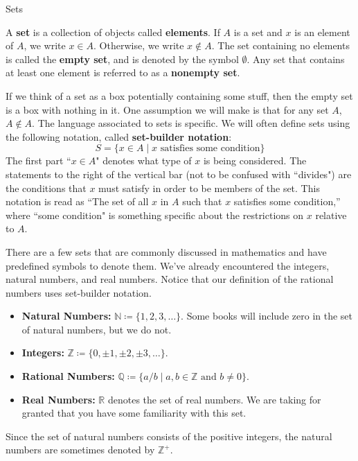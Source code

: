 \begin{section}{Sets}

\begin{definition}
A \textbf{set} is a collection of objects called \textbf{elements}. If $A$ is a set and $x$ is an element of $A$, we write $\boxed{x\in A}$. Otherwise, we write $\boxed{x\notin A}$. The set containing no elements is called the \textbf{empty set}, and is denoted by the symbol $\boxed{\emptyset}$. Any set that contains at least one element is referred to as a \textbf{nonempty set}.
\end{definition}

If we think of a set as a box potentially containing some stuff, then the empty set is a box with nothing in it. One assumption we will make is that for any set $A$, $A\notin A$. The language associated to sets is specific.  We will often define sets using the following notation, called \textbf{set-builder notation}:
\[
\boxed{S=\{x \in A\mid x \mbox{ satisfies some condition}\}}
\]
The first part ``$x \in A$" denotes what type of $x$ is being considered.  The statements to the right of the vertical bar (not to be confused with ``divides") are the conditions that $x$ must satisfy in order to be members of the set.  This notation is read as ``The set of all $x$ in $A$ such that $x$ satisfies some condition,'' where ``some condition" is something specific about the restrictions on $x$ relative to $A$.

There are a few sets that are commonly discussed in mathematics and have predefined symbols to denote them. We've already encountered the integers, natural numbers, and real numbers. Notice that our definition of the rational numbers uses set-builder notation.
\begin{itemize}
\item \textbf{Natural Numbers:} $\boxed{\mathbb{N}\coloneqq \{1,2,3,\ldots\}}$. Some books will include zero in the set of natural numbers, but we do not.
\item \textbf{Integers:} $\boxed{\mathbb{Z}\coloneqq \{0, \pm 1, \pm2, \pm 3, \ldots\}}$.
\item \textbf{Rational Numbers:} $\boxed{\mathbb{Q}\coloneqq \{a/b \mid a, b \in \mathbb{Z} \text{ and } b \neq 0\}}$.
\item \textbf{Real Numbers:} $\boxed{\mathbb{R}}$ denotes the set of real numbers. We are taking for granted that you have some familiarity with this set. 
\end{itemize}
Since the set of natural numbers consists of the positive integers, the natural numbers are sometimes denoted by $\mathbb{Z}^+$.


\end{section}
